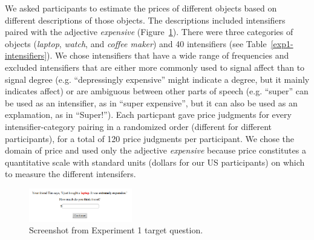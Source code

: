\documentclass[10pt,letterpaper]{article}
\newcommand{\w}[1]{\emph{#1}}
\begin{document}
We asked participants to estimate the prices of different objects based on different descriptions of those objects. The descriptions included intensifiers paired with the adjective \w{expensive} (Figure~\ref{exp1-q}).
There were three categories of objects (\emph{laptop}, \emph{watch}, and \emph{coffee maker}) and 40 intensifiers (see Table~\ref{exp1-intensifiers}).
We chose intensifiers that have a wide range of frequencies and excluded intensifiers that are either more commonly used to signal affect than to signal degree (e.g. ``depressingly expensive'' might indicate a degree, but it mainly indicates affect) or are ambiguous between other parts of speech (e.g. ``super'' can be used as an intensifier, as in ``super expensive'', but it can also be used as an explamation, as in ``Super!'').
Each particpant gave price judgments for every intensifier-category pairing in a randomized order (different for different participants), for a total of 120 price judgments per participant.
We chose the domain of price and used only the adjective \w{expensive} because price constitutes a quantitative scale with standard units (dollars for our US participants) on which to measure the different intensifers.

\begin{figure}[ht]
\begin{center}
\includegraphics[width=0.4\textwidth]{exp1-q.png}
\end{center}
\caption{Screenshot from Experiment 1 target question.} 
\label{exp1-q}
\end{figure}
\end{document}
